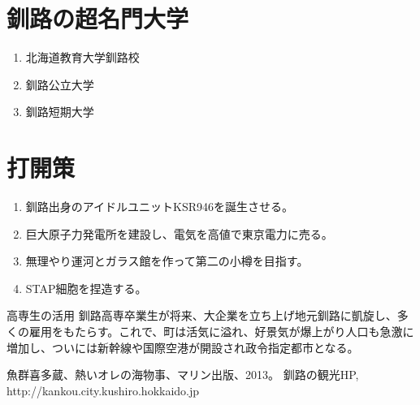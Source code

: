 \documentclass[a4j, twocolumn]{jarticle}
\begin{document}
\section{釧路の超名門大学}
\begin{enumerate}[label=(\arabic*)]
  \item 北海道教育大学釧路校
  \item 釧路公立大学
  \item 釧路短期大学
\end{enumerate}

\section{打開策}
\begin{shadebox}
\begin{enumerate}
  \item 釧路出身のアイドルユニットKSR946を誕生させる。
  \item 巨大原子力発電所を建設し、電気を高値で東京電力に売る。
  \item 無理やり運河とガラス館を作って第二の小樽を目指す。
  \item STAP細胞を捏造する。
\end{enumerate}
\end{shadebox}
\begin{itembox}{高専生の活用}
釧路高専卒業生が将来、大企業を立ち上げ地元釧路に凱旋し、多くの雇用をもたらす。これで、町は活気に溢れ、好景気が爆上がり人口も急激に増加し、ついには新幹線や国際空港が開設され政令指定都市となる。
\end{itembox}

\begin{thebibliography}{99}
   魚群喜多蔵、熱いオレの海物事、マリン出版、2013。
  釧路の観光HP, http://kankou.city.kushiro.hokkaido.jp
\end{thebibliography}
\end{document}
